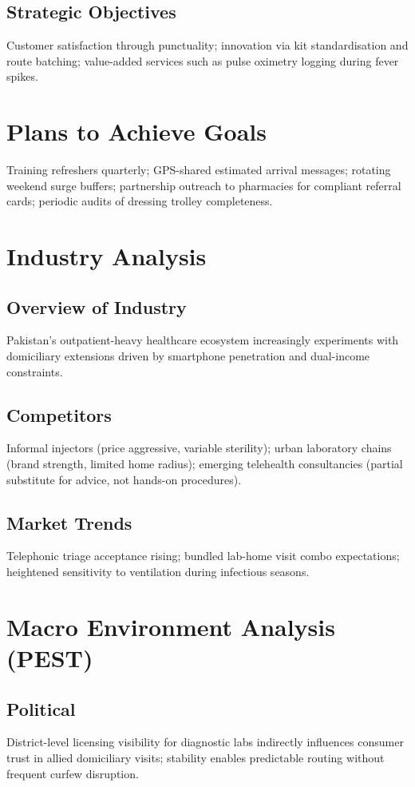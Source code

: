 \documentclass[12pt,a4paper]{report}
\begin{document}
\section{Strategic Objectives}
Customer satisfaction through punctuality; innovation via kit standardisation and route batching; value-added services such as pulse oximetry logging during fever spikes.

\chapter{Plans to Achieve Goals}

Training refreshers quarterly; GPS-shared estimated arrival messages; rotating weekend surge buffers; partnership outreach to pharmacies for compliant referral cards; periodic audits of dressing trolley completeness.

\chapter{Industry Analysis}

\section{Overview of Industry}
Pakistan's outpatient-heavy healthcare ecosystem increasingly experiments with domiciliary extensions driven by smartphone penetration and dual-income constraints.

\section{Competitors}
Informal injectors (price aggressive, variable sterility); urban laboratory chains (brand strength, limited home radius); emerging telehealth consultancies (partial substitute for advice, not hands-on procedures).

\section{Market Trends}
Telephonic triage acceptance rising; bundled lab-home visit combo expectations; heightened sensitivity to ventilation during infectious seasons.

\chapter{Macro Environment Analysis (PEST)}

\section{Political}
District-level licensing visibility for diagnostic labs indirectly influences consumer trust in allied domiciliary visits; stability enables predictable routing without frequent curfew disruption.
\end{document}
